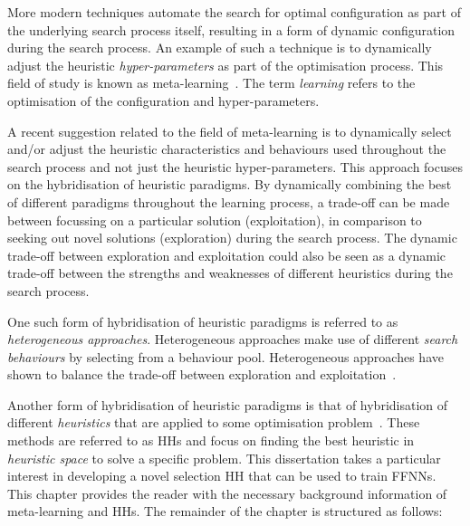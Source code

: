 More modern techniques automate the search for optimal configuration as part of the underlying search process itself, resulting in a form of dynamic configuration during the search process. An example of such a technique is to dynamically adjust the heuristic \textit{hyper-parameters} as part of the optimisation process. This field of study is known as meta-learning~\cite{ref:giraud:2004}. The term \textit{learning} refers to the optimisation of the configuration and hyper-parameters.

A recent suggestion related to the field of meta-learning is to dynamically select and/or adjust the heuristic characteristics and behaviours used throughout the search process and not just the heuristic hyper-parameters. This approach focuses on the hybridisation of heuristic paradigms. By dynamically combining the best of different  paradigms throughout the learning process, a trade-off can be made between focussing on a particular solution (exploitation), in comparison to seeking out novel solutions (exploration) during the search process. The dynamic trade-off between exploration and exploitation could also be seen as a dynamic trade-off between the strengths and weaknesses of different heuristics during the search process.

One such form of hybridisation of heuristic paradigms is referred to as \textit{heterogeneous approaches}. Heterogeneous approaches make use of different \textit{search behaviours} by selecting from a behaviour pool. Heterogeneous approaches have shown to balance the trade-off between exploration and exploitation~\cite{ref:nepomuceno:2013}.

Another form of hybridisation of heuristic paradigms is that of hybridisation of different \textit{heuristics} that are applied to some optimisation problem~\cite{ref:burke:2013}. These methods are referred to as \acfp{HH} and focus on finding the best heuristic in \textit{heuristic space} to solve a specific problem. This dissertation takes a particular interest in developing a novel selection \acs{HH} that can be used to train \acp{FFNN}. This chapter provides the reader with the necessary background information of meta-learning and \acp{HH}. The remainder of the chapter is structured as follows:

